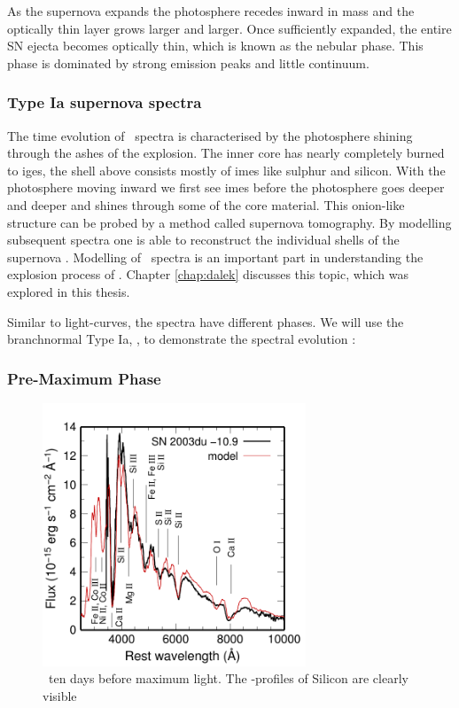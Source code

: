 As the supernova expands the photosphere recedes inward in mass and the optically thin layer grows larger and larger. Once sufficiently expanded, the entire SN ejecta becomes optically thin, which is known as the nebular phase. This phase is dominated by strong emission peaks and little continuum. 


\subsubsection{Type Ia supernova spectra}
\label{sec:intro_sneia_spectra}
The time evolution of \sneia\ spectra is characterised by the photosphere shining through the ashes of the explosion. The inner core has nearly completely burned to \glspl{ige}, the shell above consists mostly of \glspl{ime} like sulphur and silicon. With the photosphere moving inward we first see \glspl{ime} before the photosphere goes deeper and deeper and shines through some of the core material. This onion-like structure can be probed by a method called supernova tomography. By modelling subsequent spectra one is able to reconstruct the individual shells of the supernova \citep{2005MNRAS.360.1231S, 2009MNRAS.399.1238H}. 
Modelling of \sneia\ spectra is an important part in understanding the explosion process of \sneia. Chapter \ref{chap:dalek} discusses this topic, which was explored in this thesis.

Similar to light-curves, the spectra have different phases. We will use the \gls{branchnormal} Type Ia, , to demonstrate the spectral evolution \citep[][]{2011MNRAS.410.1725T}: 

\subsubsection{Pre-Maximum Phase}

\begin{figure}[tb]
\centering
\includegraphics[width=0.7\textwidth]{chapter_intro/plots/2003du_m11.pdf}
\caption[Pre-Maximum spectrum of SN 2003du]{\ ten days before maximum light. The -profiles of Silicon are clearly visible \citep[Figure kindly provided by M. Tanaka;][]{2011MNRAS.410.1725T}}
\label{fig:sn2003du_premax}
\end{figure}

